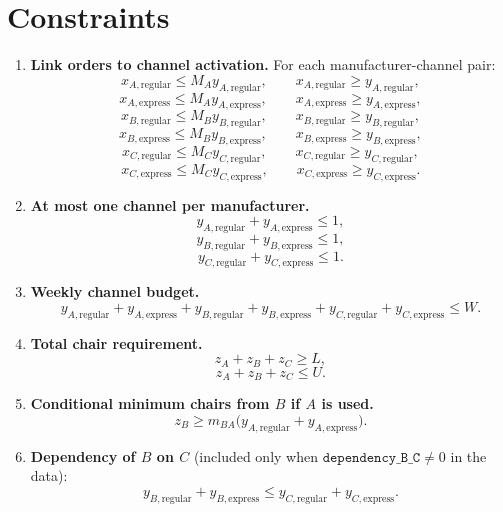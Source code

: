 \section*{Constraints}

\begin{enumerate}
    \item \textbf{Link orders to channel activation.} For each manufacturer-channel pair:
    \[
    x_{A,\mathrm{regular}} \le M_A y_{A,\mathrm{regular}},\qquad
    x_{A,\mathrm{regular}} \ge y_{A,\mathrm{regular}},
    \]
    \[
    x_{A,\mathrm{express}} \le M_A y_{A,\mathrm{express}},\qquad
    x_{A,\mathrm{express}} \ge y_{A,\mathrm{express}},
    \]
    \[
    x_{B,\mathrm{regular}} \le M_B y_{B,\mathrm{regular}},\qquad
    x_{B,\mathrm{regular}} \ge y_{B,\mathrm{regular}},
    \]
    \[
    x_{B,\mathrm{express}} \le M_B y_{B,\mathrm{express}},\qquad
    x_{B,\mathrm{express}} \ge y_{B,\mathrm{express}},
    \]
    \[
    x_{C,\mathrm{regular}} \le M_C y_{C,\mathrm{regular}},\qquad
    x_{C,\mathrm{regular}} \ge y_{C,\mathrm{regular}},
    \]
    \[
    x_{C,\mathrm{express}} \le M_C y_{C,\mathrm{express}},\qquad
    x_{C,\mathrm{express}} \ge y_{C,\mathrm{express}}.
    \]

    \item \textbf{At most one channel per manufacturer.}
    \[
    y_{A,\mathrm{regular}} + y_{A,\mathrm{express}} \le 1,
    \]
    \[
    y_{B,\mathrm{regular}} + y_{B,\mathrm{express}} \le 1,
    \]
    \[
    y_{C,\mathrm{regular}} + y_{C,\mathrm{express}} \le 1.
    \]

    \item \textbf{Weekly channel budget.}
    \[
    y_{A,\mathrm{regular}} + y_{A,\mathrm{express}}
    + y_{B,\mathrm{regular}} + y_{B,\mathrm{express}}
    + y_{C,\mathrm{regular}} + y_{C,\mathrm{express}}
    \le W.
    \]

    \item \textbf{Total chair requirement.}
    \[
    z_A + z_B + z_C \ge L,
    \]
    \[
    z_A + z_B + z_C \le U.
    \]

    \item \textbf{Conditional minimum chairs from $B$ if $A$ is used.}
    \[
    z_B \ge m_{BA}\bigl(y_{A,\mathrm{regular}} + y_{A,\mathrm{express}}\bigr).
    \]

    \item \textbf{Dependency of $B$ on $C$} (included only when $\texttt{dependency\_B\_C}\neq 0$ in the data):
    \[
    y_{B,\mathrm{regular}} + y_{B,\mathrm{express}}
    \le
    y_{C,\mathrm{regular}} + y_{C,\mathrm{express}}.
    \]
\end{enumerate}

